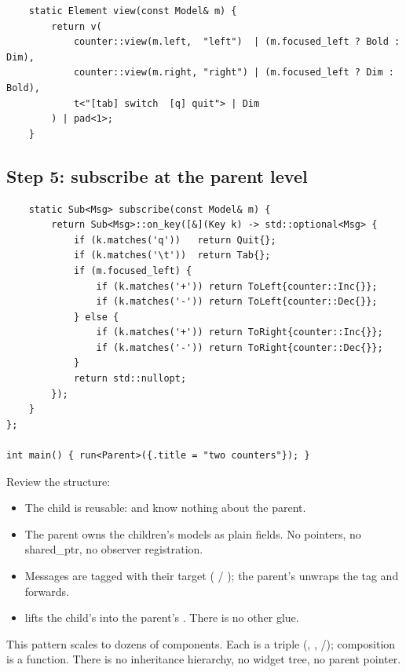 \begin{lstlisting}
    static Element view(const Model& m) {
        return v(
            counter::view(m.left,  "left")  | (m.focused_left ? Bold : Dim),
            counter::view(m.right, "right") | (m.focused_left ? Dim : Bold),
            t<"[tab] switch  [q] quit"> | Dim
        ) | pad<1>;
    }
\end{lstlisting}

\subsection*{Step 5: subscribe at the parent level}

\begin{lstlisting}
    static Sub<Msg> subscribe(const Model& m) {
        return Sub<Msg>::on_key([&](Key k) -> std::optional<Msg> {
            if (k.matches('q'))   return Quit{};
            if (k.matches('\t'))  return Tab{};
            if (m.focused_left) {
                if (k.matches('+')) return ToLeft{counter::Inc{}};
                if (k.matches('-')) return ToLeft{counter::Dec{}};
            } else {
                if (k.matches('+')) return ToRight{counter::Inc{}};
                if (k.matches('-')) return ToRight{counter::Dec{}};
            }
            return std::nullopt;
        });
    }
};

int main() { run<Parent>({.title = "two counters"}); }
\end{lstlisting}

Review the structure:

\begin{itemize}[leftmargin=*]
  \item The child is reusable:  and
     know nothing about the parent.
  \item The parent owns the children's models as plain fields.
    No pointers, no shared\_ptr, no observer registration.
  \item Messages are tagged with their target ( /
    ); the parent's  unwraps the tag
    and forwards.
  \item {} lifts the child's  into the
    parent's . There is no other glue.
\end{itemize}

\begin{idea}
This pattern scales to dozens of components. Each is a triple
(, , /); composition
is a function. There is no inheritance hierarchy, no widget tree,
no parent pointer.
\end{idea}

